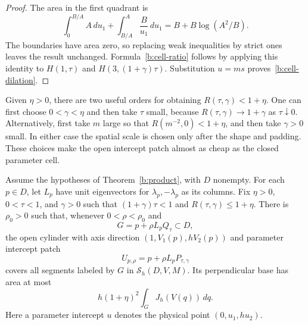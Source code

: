 \begin{proof}
The area in the first quadrant is
\[
 \int_0^{B/A}A\,du_1+
 \int_{B/A}^{A}\frac{B}{u_1}\,du_1
 =B+B\log(A^2/B).
\]
The boundaries have area zero, so replacing weak inequalities by strict
ones leaves the result unchanged.  Formula~\eqref{b:cell-ratio} follows
by applying this identity to $H(1,\tau)$ and $H(3,(1+\gamma)\tau)$.
Substitution $u=ms$ proves~\eqref{b:cell-dilation}.
\end{proof}

Given $\eta>0$, there are two useful orders for obtaining
$R(\tau,\gamma)<1+\eta$.  One can first choose
$0<\gamma<\eta$ and then take $\tau$ small, because
$R(\tau,\gamma)\to1+\gamma$ as $\tau\downarrow0$.
Alternatively, first take $m$ large so that
$R(m^{-2},0)<1+\eta$, and then take $\gamma>0$ small.
In either case the spatial scale is chosen only after the shape and
padding.  These choices make the open intercept patch almost as cheap
as the closed parameter cell.

\begin{lemma}
\label{b:product-local}
Assume the hypotheses of Theorem~\ref{b:product}, with $D$ nonempty.
For each $p\in D$, let $L_p$ have unit eigenvectors for
$\lambda_p,-\lambda_p$ as its columns.  Fix $\eta>0$,
$0<\tau<1$, and $\gamma>0$ such that $(1+\gamma)\tau<1$ and
$R(\tau,\gamma)\le1+\eta$.  There is $\rho_0>0$ such that, whenever
$0<\rho<\rho_0$ and
\[
 G=p+\rho L_pQ_\tau\subset D,
\]
the open cylinder with axis direction $(1,V_1(p),hV_2(p))$ and
parameter intercept patch
\[
 U_{p,\rho}=p+\rho L_pP_{\tau,\gamma}
\]
covers all segments labeled by $G$ in $\mathcal S_h(D,V,M)$.
Its perpendicular base has area at most
\begin{equation}
 h(1+\eta)^2\int_G J_h(V(q))\,dq.
 \label{b:product-local-cost}
\end{equation}
Here a parameter intercept $u$ denotes the physical point
$(0,u_1,hu_2)$.
\end{lemma}

